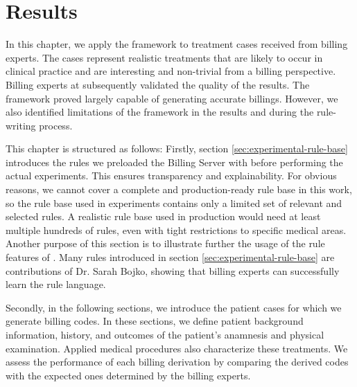 \chapter{Results}\label{ch:results}
In this chapter, we apply the framework to treatment cases received from billing experts.
The cases represent realistic treatments that are likely to occur in clinical practice and are interesting and non-trivial from a billing perspective.
Billing experts at \AV subsequently validated the quality of the results.
The framework proved largely capable of generating accurate billings.
However, we also identified limitations of the framework in the results and during the rule-writing process.

This chapter is structured as follows:
Firstly, section \ref{sec:experimental-rule-base} introduces the rules we preloaded the Billing Server with before performing the actual experiments.
This ensures transparency and explainability.
For obvious reasons, we cannot cover a complete and production-ready rule base in this work, so the rule base used in experiments contains only a limited set of relevant and selected rules.
A realistic rule base used in production would need at least multiple hundreds of rules, even with tight restrictions to specific medical areas.
Another purpose of this section is to illustrate further the usage of the rule features of \RL.
Many rules introduced in section \ref{sec:experimental-rule-base} are contributions of Dr. Sarah Bojko, showing that billing experts can successfully learn the rule language.

Secondly, in the following sections, we introduce the patient cases for which we generate billing codes.
In these sections, we define patient background information, history, and outcomes of the patient's anamnesis and physical examination.
Applied medical procedures also characterize these treatments.
We assess the performance of each billing derivation by comparing the derived codes with the expected ones determined by the billing experts.





